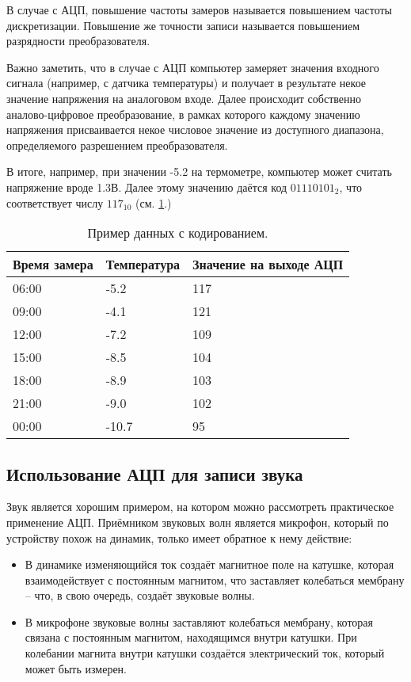 \documentclass[../sparc.tex]{subfiles}
\begin{document}
В случае с АЦП, повышение частоты замеров называется повышением частоты
дискретизации.  Повышение же точности записи называется повышением разрядности
преобразователя.

Важно заметить, что в случае с АЦП компьютер замеряет значения входного сигнала
(например, с датчика температуры) и получает в результате некое значение
напряжения на аналоговом входе.  Далее происходит собственно аналово-цифровое
преобразование, в рамках которого каждому значению напряжения присваивается
некое числовое значение из доступного диапазона, определяемого разрешением
преобразователя.

В итоге, например, при значении -5.2 на термометре, компьютер может считать
напряжение вроде 1.3В.  Далее этому значению даётся код $01110101_2$, что
соответствует числу $117_{10}$ (см. \ref{table:adc-temperature-data-example-4}.)

\begin{table}[h]
  \centering
  \begin{tabular}{p{3cm}|p{4cm}|p{4cm}}
    Время замера & Температура & Значение на выходе АЦП \\
    \hline \hline
    06:00 & -5.2  & 117 \\
    \hline
    09:00 & -4.1  & 121 \\
    \hline
    12:00 & -7.2  & 109 \\
    \hline
    15:00 & -8.5  & 104 \\
    \hline
    18:00 & -8.9  & 103 \\
    \hline
    21:00 & -9.0  & 102 \\
    \hline
    00:00 & -10.7 & 95 \\
    \hline
  \end{tabular}
  \caption{Пример данных с кодированием.}
  \label{table:adc-temperature-data-example-4}
\end{table}

\subsection{Использование АЦП для записи звука}

Звук является хорошим примером, на котором можно рассмотреть практическое
применение АЦП.  Приёмником звуковых волн является микрофон, который по
устройству похож на динамик, только имеет обратное к нему действие:

\begin{itemize}
\item В динамике изменяющийся ток создаёт магнитное поле на катушке, которая
  взаимодействует с постоянным магнитом, что заставляет колебаться мембрану --
  что, в свою очередь, создаёт звуковые волны.
\item В микрофоне звуковые волны заставляют колебаться мембрану, которая связана
  с постоянным магнитом, находящимся внутри катушки.  При колебании магнита
  внутри катушки создаётся электрический ток, который может быть измерен.
\end{itemize}
\end{document}
